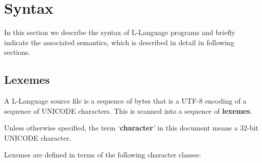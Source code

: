 \documentclass[12pt]{article}
\newcommand{\key}[1]{{\rm \bfseries #1}}
\newcommand{\skey}[2]{{\rm \bfseries #1#2}}
\begin{document}
\section{Syntax}

In this section we describe the syntax of L-Language programs
and briefly indicate the associated semantics, which is
described in detail in following sections.

\subsection{Lexemes}
\label{LEXEMES}

A L-Language source file is a sequence of bytes that is a UTF-8 encoding
of a sequence of UNICODE characters.  This is scanned into a sequence
of \skey{lexeme}s.

Unless otherwise specified, the term `\key{character}' in this
document means a 32-bit UNICODE character.

Lexemes are defined in terms of
the following character classes:
\end{document}

